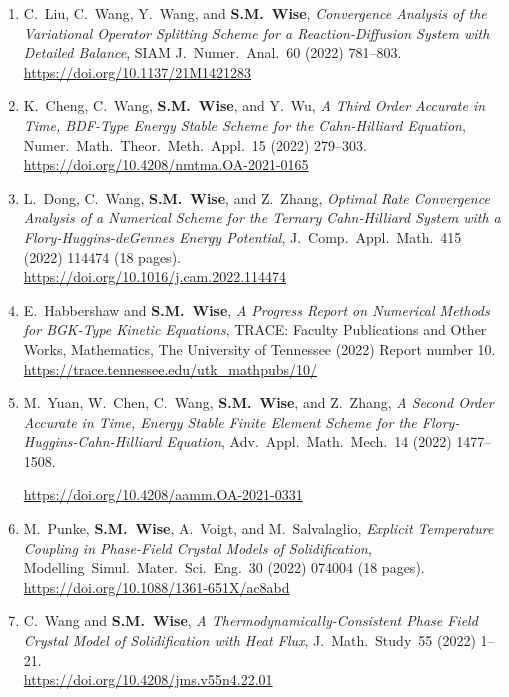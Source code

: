 \documentclass[11pt]{letter}
\begin{document}
\begin{enumerate}
	\item
C.~Liu, C.~Wang, Y.~Wang, and \textbf{S.M.~Wise}, {\sl Convergence Analysis of the Variational Operator Splitting Scheme for a Reaction-Diffusion System with Detailed Balance}, SIAM J.~Numer.~Anal.~60 (2022) 781--803.
	\\
\url{https://doi.org/10.1137/21M1421283}

	\item
K.~Cheng, C.~Wang, \textbf{S.M.~Wise}, and Y.~Wu, {\sl A Third Order Accurate in Time, BDF-Type Energy Stable Scheme for the Cahn-Hilliard Equation}, Numer.~Math.~Theor.~Meth.~Appl.~15 (2022) 279--303.
	\\
\url{https://doi.org/10.4208/nmtma.OA-2021-0165}

	\item
L.~Dong, C.~Wang, \textbf{S.M.~Wise}, and Z.~Zhang, {\sl Optimal Rate Convergence Analysis of a Numerical Scheme for the Ternary Cahn-Hilliard System with a Flory-Huggins-deGennes Energy Potential}, J.~Comp.~Appl.~Math.~415 (2022) 114474 (18 pages).
	\\
\url{https://doi.org/10.1016/j.cam.2022.114474}

	\item
E.~Habbershaw and \textbf{S.M.~Wise}, {\sl A Progress Report on Numerical Methods for BGK-Type Kinetic Equations}, TRACE: Faculty Publications and Other Works, Mathematics, The University of Tennessee (2022) Report number 10.
 	\\
\url{https://trace.tennessee.edu/utk_mathpubs/10/}

	\item
M.~Yuan, W.~Chen, C.~Wang, \textbf{S.M.~Wise}, and Z.~Zhang, {\sl A Second Order Accurate in Time, Energy Stable Finite Element Scheme for the Flory-Huggins-Cahn-Hilliard Equation}, Adv.~Appl.~Math.~Mech.~14 (2022) 1477--1508.

\url{https://doi.org/10.4208/aamm.OA-2021-0331}

	\item
M.~Punke, \textbf{S.M.~Wise}, A.~Voigt, and M.~Salvalaglio, {\sl  Explicit Temperature Coupling in Phase-Field Crystal Models of Solidification}, Modelling~Simul.~Mater.~Sci.~Eng.~30 (2022) 074004 (18 pages).
	\\ 
\url{https://doi.org/10.1088/1361-651X/ac8abd}

	\item
C.~Wang  and \textbf{S.M.~Wise}, {\sl A Thermodynamically-Consistent Phase Field Crystal Model of Solidification with Heat Flux}, J.~Math.~Study~55 (2022) 1--21.
	\\
\url{https://doi.org/10.4208/jms.v55n4.22.01}


\end{enumerate}
\end{document}
